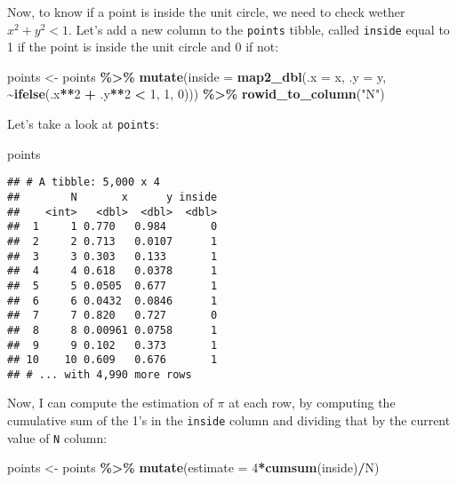 \documentclass[
]{article}
\newenvironment{Shaded}{\begin{snugshade}}{\end{snugshade}}
\newcommand{\DataTypeTok}[1]{\textcolor[rgb]{0.13,0.29,0.53}{#1}}
\newcommand{\DecValTok}[1]{\textcolor[rgb]{0.00,0.00,0.81}{#1}}
\newcommand{\KeywordTok}[1]{\textcolor[rgb]{0.13,0.29,0.53}{\textbf{#1}}}
\newcommand{\NormalTok}[1]{#1}
\newcommand{\OperatorTok}[1]{\textcolor[rgb]{0.81,0.36,0.00}{\textbf{#1}}}
\newcommand{\StringTok}[1]{\textcolor[rgb]{0.31,0.60,0.02}{#1}}
\begin{document}
Now, to know if a point is inside the unit circle, we need to check wether \(x^2 + y^2 < 1\). Let's
add a new column to the \texttt{points} tibble, called \texttt{inside} equal to 1 if the point is inside the
unit circle and 0 if not:

\begin{Shaded}
\begin{Highlighting}[]
\NormalTok{points \textless{}{-}}\StringTok{ }\NormalTok{points }\OperatorTok{\%\textgreater{}\%}
\StringTok{    }\KeywordTok{mutate}\NormalTok{(}\DataTypeTok{inside =} \KeywordTok{map2\_dbl}\NormalTok{(}\DataTypeTok{.x =}\NormalTok{ x, }\DataTypeTok{.y =}\NormalTok{ y, }\OperatorTok{\textasciitilde{}}\KeywordTok{ifelse}\NormalTok{(.x}\OperatorTok{**}\DecValTok{2} \OperatorTok{+}\StringTok{ }\NormalTok{.y}\OperatorTok{**}\DecValTok{2} \OperatorTok{\textless{}}\StringTok{ }\DecValTok{1}\NormalTok{, }\DecValTok{1}\NormalTok{, }\DecValTok{0}\NormalTok{))) }\OperatorTok{\%\textgreater{}\%}
\StringTok{    }\KeywordTok{rowid\_to\_column}\NormalTok{(}\StringTok{"N"}\NormalTok{)}
\end{Highlighting}
\end{Shaded}

Let's take a look at \texttt{points}:

\begin{Shaded}
\begin{Highlighting}[]
\NormalTok{points}
\end{Highlighting}
\end{Shaded}

\begin{verbatim}
## # A tibble: 5,000 x 4
##        N       x      y inside
##    <int>   <dbl>  <dbl>  <dbl>
##  1     1 0.770   0.984       0
##  2     2 0.713   0.0107      1
##  3     3 0.303   0.133       1
##  4     4 0.618   0.0378      1
##  5     5 0.0505  0.677       1
##  6     6 0.0432  0.0846      1
##  7     7 0.820   0.727       0
##  8     8 0.00961 0.0758      1
##  9     9 0.102   0.373       1
## 10    10 0.609   0.676       1
## # ... with 4,990 more rows
\end{verbatim}

Now, I can compute the estimation
of \(\pi\) at each row, by computing the cumulative sum of the 1's in the \texttt{inside} column and dividing
that by the current value of \texttt{N} column:

\begin{Shaded}
\begin{Highlighting}[]
\NormalTok{points \textless{}{-}}\StringTok{ }\NormalTok{points }\OperatorTok{\%\textgreater{}\%}
\StringTok{    }\KeywordTok{mutate}\NormalTok{(}\DataTypeTok{estimate =} \DecValTok{4}\OperatorTok{*}\KeywordTok{cumsum}\NormalTok{(inside)}\OperatorTok{/}\NormalTok{N)}
\end{Highlighting}
\end{Shaded}
\end{document}
